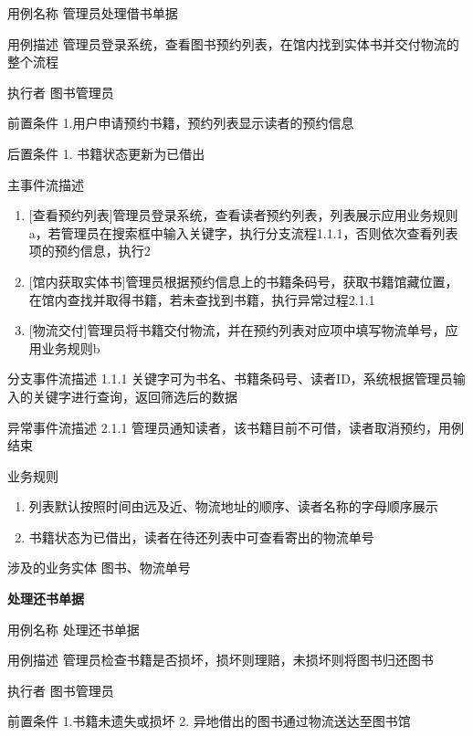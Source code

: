     用例名称     管理员处理借书单据

    用例描述     管理员登录系统，查看图书预约列表，在馆内找到实体书并交付物流的整个流程    
    
    执行者      图书管理员        
    
    前置条件     1.用户申请预约书籍，预约列表显示读者的预约信息   
    
    后置条件     1. 书籍状态更新为已借出     
    
    主事件流描述   \begin{enumerate} 
            \item {[查看预约列表]}管理员登录系统，查看读者预约列表，列表展示应用业务规则a，若管理员在搜索框中输入关键字，执行分支流程1.1.1，否则依次查看列表项的预约信息，执行2
            \item {[馆内获取实体书]}管理员根据预约信息上的书籍条码号，获取书籍馆藏位置，在馆内查找并取得书籍，若未查找到书籍，执行异常过程2.1.1
            \item {[物流交付]}管理员将书籍交付物流，并在预约列表对应项中填写物流单号，应用业务规则b
        \end{enumerate}  
    
    分支事件流描述  1.1.1 关键字可为书名、书籍条码号、读者ID，系统根据管理员输入的关键字进行查询，返回筛选后的数据     
    
    异常事件流描述  2.1.1 管理员通知读者，该书籍目前不可借，读者取消预约，用例结束                                                                               
    
    业务规则      \begin{enumerate}[label=\alph*]
        \item 列表默认按照时间由远及近、物流地址的顺序、读者名称的字母顺序展示
        \item 书籍状态为已借出，读者在待还列表中可查看寄出的物流单号    
    \end{enumerate}  
    
    涉及的业务实体  图书、物流单号     
    
    \textbf{处理还书单据 }
    
    用例名称     处理还书单据    
    
    用例描述     管理员检查书籍是否损坏，损坏则理赔，未损坏则将图书归还图书    
    
    执行者      图书管理员         
    
    前置条件     1.书籍未遗失或损坏        2. 异地借出的图书通过物流送达至图书馆     
    
